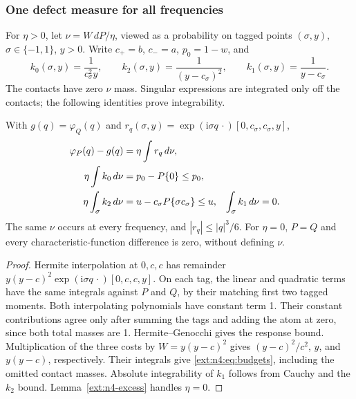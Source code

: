 \subsubsection{One defect measure for all frequencies}
For $\eta>0$, let $\nu=W\,dP/\eta$, viewed as a probability on
tagged points $(\sigma,y)$, $\sigma\in\{-1,1\}$, $y>0$.
Write $c_+=b$, $c_-=a$, $p_0=1-w$, and
\[
 k_0(\sigma,y)=\frac1{c_\sigma^2y},\qquad
 k_2(\sigma,y)=\frac1{(y-c_\sigma)^2},\qquad
 k_1(\sigma,y)=\frac1{y-c_\sigma}.
\]
The contacts have zero $\nu$ mass. Singular expressions are integrated
only off the contacts; the following identities prove integrability.

\begin{lemma}\label{ext:n4:lem:common-measure}
With $g(q)=\varphi_Q(q)$ and
$r_q(\sigma,y)=\exp(\mathrm i\sigma q\,\cdot)[0,c_\sigma,c_\sigma,y]$,
\begin{align}
 \varphi_P(q)-g(q)&=\eta\int r_q\,d\nu,\notag\\
 \eta\int k_0\,d\nu&=p_0-P\{0\}\le p_0,\notag\\
 \eta\int_{\sigma}k_2\,d\nu&=u-c_\sigma P\{\sigma c_\sigma\}\le u,
 &\int_{\sigma}k_1\,d\nu&=0.\label{ext:n4:eq:budgets}
\end{align}
The same $\nu$ occurs at every frequency, and $|r_q|\le |q|^3/6$.
For $\eta=0$, $P=Q$ and every characteristic-function difference is
zero, without defining $\nu$.
\end{lemma}
\begin{proof}
Hermite interpolation at $0,c,c$ has remainder
$y(y-c)^2\exp(\mathrm i\sigma q\,\cdot)[0,c,c,y]$.
On each tag, the linear and quadratic terms have the same integrals
against $P$ and $Q$, by their matching first two tagged moments.
Both interpolating polynomials have constant term 1. Their constant
contributions agree only after summing the tags and adding the atom
at zero, since both total masses are 1.
Hermite--Genocchi gives the response bound. Multiplication of the
three costs by $W=y(y-c)^2$ gives
$(y-c)^2/c^2$, $y$, and $y(y-c)$, respectively.
Their integrals give \eqref{ext:n4:eq:budgets}, including the omitted
contact masses. Absolute integrability of $k_1$ follows from Cauchy
and the $k_2$ bound. Lemma~\ref{ext:n4-excess} handles $\eta=0$.
\end{proof}

